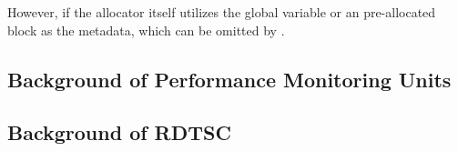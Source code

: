 However, if the allocator itself utilizes the global variable or an pre-allocated block as the metadata, which can be omitted by \MP{}. 

 


\subsection{Background of Performance Monitoring Units}
\label{sec:pmu}

\subsection{Background of RDTSC}

\label{sec:rdtsc}






